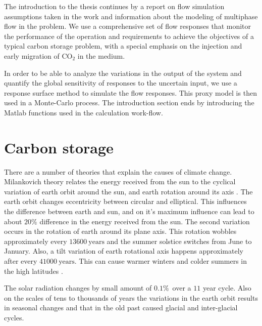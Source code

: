 The introduction to the thesis continues by a report on flow simulation assumptions taken in the work and information about the modeling of multiphase flow in the problem. We use a comprehensive set of flow responses that monitor the performance of the operation and requirements to achieve the objectives of a typical carbon storage problem, with a special emphasis on the injection and early migration of $\mbox{CO}_2$ in the medium.  

In order to be able to analyze the variations in the output of the system and quantify the global sensitivity of responses to the uncertain input, we use a response surface method to simulate the flow responses. This proxy model is then used in a Monte-Carlo process. The introduction section ends by introducing the Matlab functions used in the calculation work-flow. 

\section{Carbon storage}

There are a number of theories that explain the causes of climate change. Milankovich theory relates the energy received from the sun to the  cyclical variation of earth orbit around the sun, and earth rotation around its axis \cite{foukal2006variations}. The earth orbit changes eccentricity between circular and elliptical. This influences the difference between earth and sun, and on it's maximum influence can lead to about $20\%$ difference in the energy received from the sun. The second variation occurs in the rotation of earth around its plane axis. This rotation wobbles approximately every $13600~\mbox{years}$ and the summer solstice switches from June to January. Also, a tilt variation of earth rotational axis happens approximately after every $41000~\mbox{years}$. This can cause warmer winters and colder summers in the high latitudes \cite{foukal2006variations}. 


The solar radiation changes by small amount of $0.1\%$~over a $11$ year cycle. Also on the scales of tens to thousands of years the variations in the earth orbit results in seasonal changes and that in the old past caused glacial and inter-glacial cycles.


